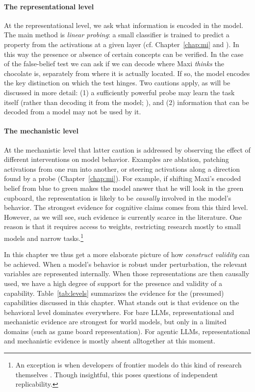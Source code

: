 \paragraph{The representational level} At the representational level,  we ask what information is encoded in the model. The main method is {\em linear probing}: a small classifier is trained to predict a property from the activations at a given layer (cf. Chapter~\ref{chap:mi} and \citet{alain2016understanding, belinkov2022probing}). In this way the presence or absence of certain concepts can be verified. In the case of the false-belief test we can ask if  we can decode where Maxi {\em thinks} the chocolate is, separately from where it is actually located. If so, the model encodes the key distinction on which the test hinges. Two cautions apply, as will be discussed in more detail: (1) a sufficiently powerful probe may learn the task itself (rather than decoding it from the model; \citep{hewitt2019designing}), and (2) information that can be decoded from a model may not be used by it.

\paragraph{The mechanistic level} At the mechanistic level   that latter caution is addressed by observing the effect of different interventions on model behavior. Examples are ablation, patching activations from one run into another, or steering activations along a direction found by a probe (Chapter~\ref{chap:mi}). For example, if shifting Maxi's encoded belief from blue to green makes the model answer that he will look in the green cupboard, the representation is likely to be {\em causally} involved in the model's behavior. The strongest evidence for cognitive claims comes from this third level. However, as we will see, such evidence is currently scarce in the literature. One reason is that it requires access to weights, restricting research mostly to small models and narrow tasks.\footnote{An exception is when developers of frontier models do this kind of research themselves \citep[as in][]{templeton2024scaling, lindsey2025biology}. Though insightful, this poses questions of independent replicability.}

In this chapter we thus get a more elaborate picture of how {\em construct validity} can be achieved. When a model's behavior is robust under perturbation, the relevant variables are represented internally. When those representations are then causally used, we have a high degree of support for the presence and validity of a capability. Table~\ref{tab:levels} summarizes the evidence for the (presumed) capabilities discussed in this chapter. What stands out is that evidence on the behavioral level dominates everywhere. For bare LLMs, representational and mechanistic evidence are strongest for world models, but only in a limited domains (such as game board representation). For agentic LLMs, representational and mechanistic evidence is mostly absent alltogether at this moment.

